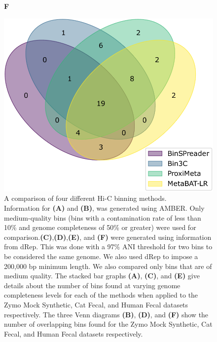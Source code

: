 \documentclass[fleqn,10pt,lineno]{wlpeerj}
\begin{document}
\begin{figure}[ht!]
\begin{minipage}[t]{0.50\textwidth}
    \end{minipage}
    \hfill
    \begin{minipage}[t]{0.42\textwidth}
        \captionsetup{justification=raggedright, singlelinecheck=false, labelformat=empty,font=large}
        \caption*{\textbf{F}}
        \includegraphics[scale=0.42]{human_filtered_venn4_cropped.pdf}
    \end{minipage}
    \hfill
    

    \caption{A comparison of four different Hi-C binning methods. 
    \\Information for \textbf{(A)} and \textbf{(B)}, was generated using AMBER. Only medium-quality bins (bins with a contamination rate of less than 10\% and genome completeness of 50\% or greater) were used for comparison.\textbf{(C)},\textbf{(D)},\textbf{(E)}, and \textbf{(F)} were generated using information from dRep. This was done with a 97\% ANI threshold for two bins to be considered the same genome. We also used dRep to impose a 200,000 bp minimum length. We also compared only bins that are of medium quality. The stacked bar graphs \textbf{(A)}, \textbf{(C)}, and \textbf{(E)} give details about the number of bins found at varying genome completeness levels for each of the methods when applied to the Zymo Mock Synthetic, Cat Fecal, and Human Fecal datasets respectively. The three Venn diagrams \textbf{(B)}, \textbf{(D)}, and \textbf{(F)} show the number of overlapping bins found for the Zymo Mock Synthetic, Cat Fecal, and Human Fecal datasets respectively.}
    \label{fig:Comparison_Fig}
\end{figure}
\end{document}
